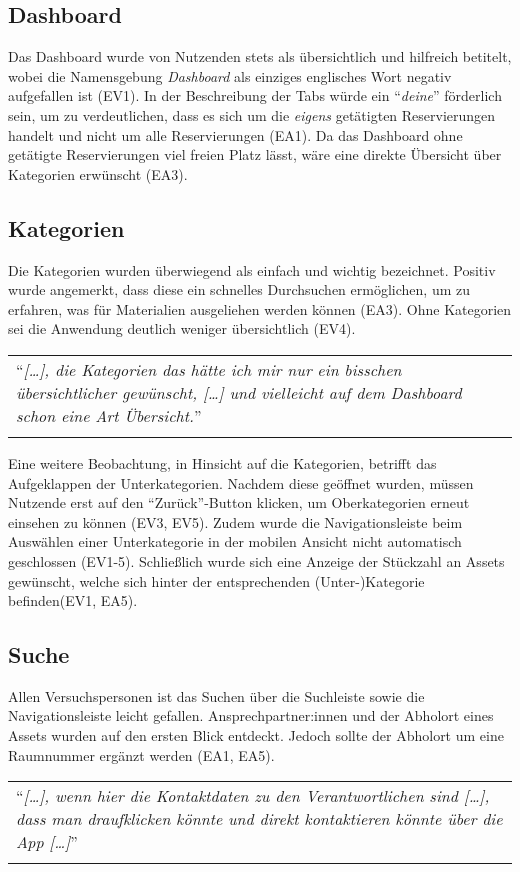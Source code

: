 \subsection{Dashboard}
Das Dashboard wurde von Nutzenden stets als übersichtlich und hilfreich
betitelt, wobei die Namensgebung \textit{Dashboard} als einziges englisches
Wort negativ aufgefallen ist (EV1). In der Beschreibung der Tabs würde ein
\enquote{\textit{deine}} förderlich sein, um zu verdeutlichen, dass es sich um die \textit{eigens}
getätigten Reservierungen handelt und nicht um alle Reservierungen (EA1). Da
das Dashboard ohne getätigte Reservierungen viel freien Platz lässt, wäre eine
direkte Übersicht über Kategorien erwünscht (EA3).

\subsection{Kategorien}
Die Kategorien wurden überwiegend als einfach und wichtig bezeichnet. Positiv wurde angemerkt, dass
diese ein schnelles Durchsuchen ermöglichen, um zu erfahren, was für Materialien ausgeliehen werden
können (EA3). Ohne Kategorien sei die Anwendung deutlich weniger übersichtlich (EV4).

\begin{longtable}{p{}} \arrayrulecolor{maincolor}\hline
        \enquote{\textit{[\dots], die Kategorien das hätte ich mir nur ein bisschen
                        übersichtlicher gewünscht, [\dots] und vielleicht auf dem Dashboard schon eine
        Art Übersicht.}} \\
        \arrayrulecolor{maincolor}\hline
\end{longtable}

Eine weitere Beobachtung, in Hinsicht auf die Kategorien, betrifft das Aufgeklappen der
Unterkategorien. Nachdem diese geöffnet wurden, müssen Nutzende erst auf den \enquote{Zurück}-Button
klicken, um Oberkategorien erneut einsehen zu können (EV3, EV5). Zudem wurde die Navigationsleiste
beim Auswählen einer Unterkategorie in der mobilen Ansicht nicht automatisch geschlossen (EV1-5).
Schließlich wurde sich eine Anzeige der Stückzahl an Assets gewünscht, welche sich hinter der
entsprechenden (Unter-)Kategorie befinden(EV1, EA5).

\subsection{Suche}
Allen Versuchspersonen ist das Suchen über die Suchleiste sowie die Navigationsleiste leicht
gefallen. Ansprechpartner:innen und der Abholort eines Assets wurden auf den ersten Blick entdeckt.
Jedoch sollte der Abholort um eine Raumnummer ergänzt werden (EA1, EA5).
\begin{longtable}{p{}} \arrayrulecolor{maincolor}\hline
        \enquote{\textit{[\dots], wenn hier die Kontaktdaten zu den Verantwortlichen
                        sind [\dots], dass man draufklicken könnte und direkt kontaktieren könnte
        über die App [\dots]}} \\
        \arrayrulecolor{maincolor}\hline
\end{longtable}

